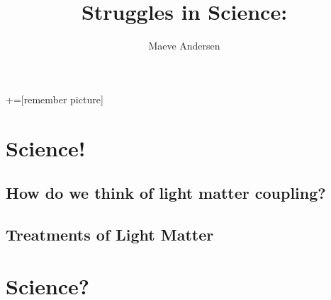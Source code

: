 \documentclass{beamer}
\title{Struggles in Science:}
\author{Maeve Andersen}
\begin{document}
+=[remember picture]

\everymath{\displaystyle}

\maketitle

\frame{\tableofcontents}

\section{Science!}
\subsection{How do we think of light matter coupling?}
\subsection{Treatments of Light Matter}

\section{Science?}

\end{document}
